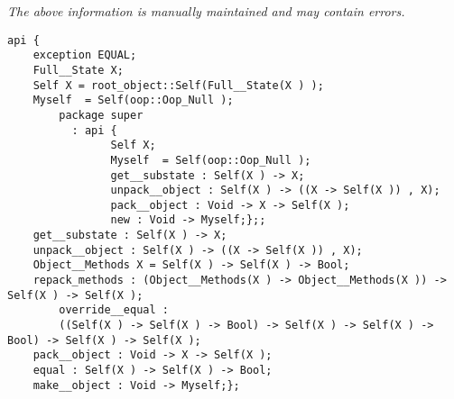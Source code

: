 \label{api:Object}

{\tiny \it The above information is manually maintained and may contain errors.}
\begin{verbatim}
api {
    exception EQUAL;
    Full__State X;
    Self X = root_object::Self(Full__State(X ) );
    Myself  = Self(oop::Oop_Null );
        package super
          : api {
                Self X;
                Myself  = Self(oop::Oop_Null );
                get__substate : Self(X ) -> X;
                unpack__object : Self(X ) -> ((X -> Self(X )) , X);
                pack__object : Void -> X -> Self(X );
                new : Void -> Myself;};;
    get__substate : Self(X ) -> X;
    unpack__object : Self(X ) -> ((X -> Self(X )) , X);
    Object__Methods X = Self(X ) -> Self(X ) -> Bool;
    repack_methods : (Object__Methods(X ) -> Object__Methods(X )) -> Self(X ) -> Self(X );
        override__equal :
        ((Self(X ) -> Self(X ) -> Bool) -> Self(X ) -> Self(X ) -> Bool) -> Self(X ) -> Self(X );
    pack__object : Void -> X -> Self(X );
    equal : Self(X ) -> Self(X ) -> Bool;
    make__object : Void -> Myself;};
\end{verbatim}
